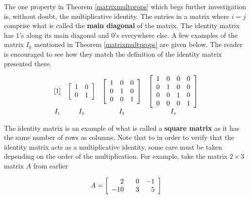 The one property in Theorem \ref{matrixmultprops} which begs further investigation is, without doubt, the multiplicative identity.  \label{maindiagonal} The entries in a matrix where $i=j$ comprise what is called the   \textbf{main diagonal} of the matrix.  The identity matrix has $1$'s along its main diagonal and $0$'s everywhere else.  A few examples of the matrix $I_{k}$ mentioned in Theorem \ref{matrixmultprops} are given below.  The reader is encouraged to see how they match the definition of the identity matrix presented there.

\[ \begin{array}{ccccc}

[1] & \left[ \begin{array}{rr} 1 & 0 \\ 0 & 1 \\ \end{array} \right] & \left[ \begin{array}{rrr} 1 & 0 & 0 \\ 0 & 1 & 0 \\ 0 & 0 & 1 \\ \end{array} \right] & \left[ \begin{array}{rrrr} 1 & 0 & 0 & 0 \\ 0 & 1 & 0 & 0 \\ 0 & 0 & 1 & 0 \\  0 & 0 & 0 & 1 \\  \end{array} \right] \\
I_{\mbox{\tiny$1$}} & I_{\mbox{\tiny$2$}} & I_{\mbox{\tiny$3$}} & I_{\mbox{\tiny$4$}} \\

\end{array} \]

The identity matrix is an example of what is called a   \textbf{square matrix} as it has the same number of rows as columns.  Note that to in order to verify that the identity matrix acts as a multiplicative identity, some care must be taken depending on the order of the multiplication.  For example, take the matrix $2 \times 3$ matrix $A$ from earlier

\[A = \left[\begin{array}{rrr} 2 & \hphantom{-}0 & -1 \\ -10 & 3 & 5 \\ \end{array} \right]\]

